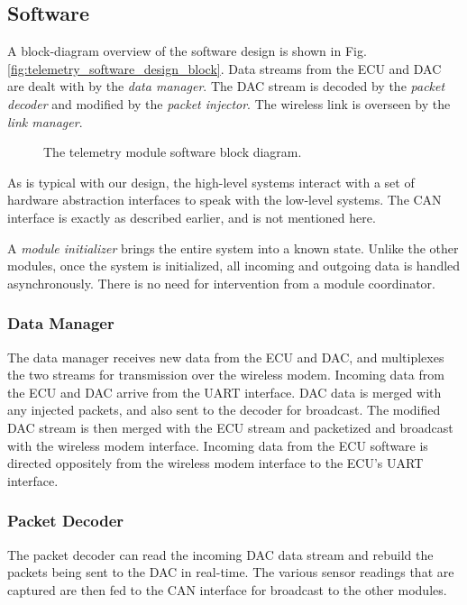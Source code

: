 \subsection{Software}
	
A block-diagram overview of the software design is shown in Fig. \ref{fig:telemetry_software_design_block}. Data streams from the ECU and DAC are dealt with by the \emph{data manager}. The DAC stream is decoded by the \emph{packet decoder} and modified by the \emph{packet injector}. The wireless link is overseen by the \emph{link manager}. 

\begin{figure}[H]
	\centering
	
	\caption{The telemetry module software block diagram.}
	\label{fig:telemetry_software_block}
\end{figure}

As is typical with our design, the high-level systems interact with a set of hardware abstraction interfaces to speak with the low-level systems. The CAN interface is exactly as described earlier, and is not mentioned here.

A \emph{module initializer} brings the entire system into a known state. Unlike the other modules, once the system is initialized, all incoming and outgoing data is handled asynchronously. There is no need for intervention from a module coordinator. 

\subsubsection{Data Manager}

The data manager receives new data from the ECU and DAC, and multiplexes the two streams for transmission over the wireless modem. Incoming data from the ECU and DAC arrive from the UART interface. DAC data is merged with any injected packets, and also sent to the decoder for broadcast. The modified DAC stream is then merged with the ECU stream and packetized and broadcast with the wireless modem interface. Incoming data from the ECU software is directed oppositely from the wireless modem interface to the ECU's UART interface.

\subsubsection{Packet Decoder}

The packet decoder can read the incoming DAC data stream and rebuild the packets being sent to the DAC in real-time. The various sensor readings that are captured are then fed to the CAN interface for broadcast to the other modules.

